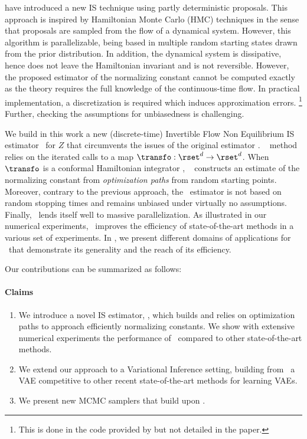 \cite{rotskoff:vanden-eijden:2019} have introduced a new IS technique using partly deterministic proposals.
This approach is inspired by Hamiltonian Monte Carlo (HMC) techniques in the sense that proposals are sampled from the flow of a dynamical system. However, this algorithm is parallelizable, being based in multiple random starting states drawn from the prior distribution. In addition, the dynamical system is dissipative, hence does not leave the Hamiltonian invariant and  is not reversible. 
However, the proposed estimator of the normalizing constant cannot be computed exactly as the theory requires the full knowledge of the continuous-time flow. In practical implementation, a discretization is required which induces approximation errors.
\footnote{This is done in the code provided by
  \cite{rotskoff:vanden-eijden:2019} but not detailed in the
  paper.}
  Further, checking the assumptions for unbiasedness is challenging.
  
  We build in this work  a new (discrete-time) Invertible Flow Non Equilibrium IS estimator  \IFIS\ for $Z$ that circumvents the issues of the original estimator \cite{rotskoff:vanden-eijden:2019}. \IFIS~ method relies on the iterated calls to a map $\transfo : \rset^{d} \to \rset^{d}$.
When $\transfo$ is a conformal Hamiltonian integrator \citep{francca2019conformal}, \IFIS~ constructs an estimate of the normalizing constant from \emph {optimization paths} from random starting points. 
Moreover, contrary to the previous approach, the \IFIS~estimator is not based on random stopping times and remains unbiased under virtually no assumptions. Finally, \IFIS\ lends itself well to massive parallelization.
As illustrated in our numerical experiments, \IFIS\ improves the efficiency of state-of-the-art methods in a various set of experiments.
In , we present  different domains of applications for \IFIS\ that demonstrate its generality and the reach of its efficiency.
  
  Our contributions can be summarized as follows:
\paragraph{Claims}
\begin{enumerate}[label=\textbf{(\roman*)}]
    \item We introduce a novel IS estimator, \IFIS, which builds and relies on optimization paths to approach efficiently normalizing constants. We show with extensive numerical experiments the performance of \IFIS\ compared to other state-of-the-art methods.
    \item We extend our approach to a Variational Inference setting, building from \IFIS\ a VAE competitive to other recent state-of-the-art methods for learning VAEs.
    \item We present new MCMC samplers that build upon \IFIS. 
\end{enumerate}


